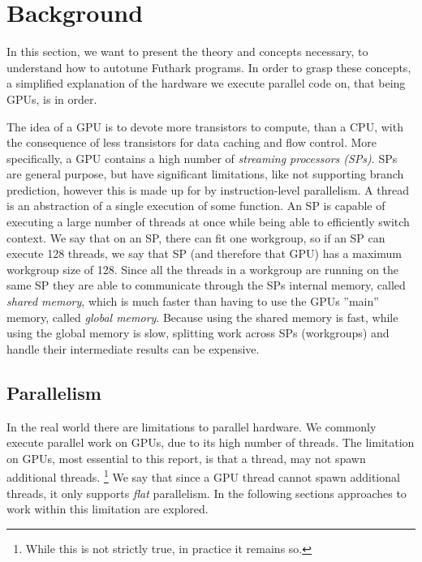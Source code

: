 \section{Background}
\label{BabyGotBack}
\begin{comment}
A common way to increase computer performance, is to increase the capacity for parallelism. For practical usage, however, this is difficult to implement, due to low-level GPU-specific languages requiring domain specific knowledge to make full use of that capacity. A vast amount of work has gone into transforming high-level hardware-agnostic code into these low-level GPU-specific languages \cite{inc-flat}. 
\end{comment}
In this section, we want to present the theory and concepts necessary, to
understand how to autotune Futhark programs. In order to grasp these concepts,
a simplified explanation of the hardware we execute parallel code on,
that being GPUs, is in order. 

The idea of a GPU is to devote more transistors to compute, than a CPU, with
the consequence of less transistors for data caching and flow control. More
specifically, a GPU contains a high number of \textit{streaming
processors (SPs)}. SPs are general purpose, but have significant
limitations, like not supporting branch prediction, however this is made up for by
instruction-level parallelism. A thread is an abstraction of a single execution of
some function. An SP is capable of executing a large number of threads at once while being
able to efficiently switch context. We say that on an SP, there can fit one workgroup,
so if an SP can execute 128 threads, we say that SP (and therefore that GPU) has a
maximum workgroup size of 128. Since all the threads in a workgroup are running
on the same SP they are able to communicate through the SPs
internal memory, called \textit{shared memory}, which is much faster than
having to use the GPUs ''main'' memory, called \textit{global memory}.
Because using the shared memory is fast, while using the global memory is
slow, splitting work across SPs (workgroups) and handle their intermediate
results can be expensive.

\subsection{Parallelism} 
In the real world there are limitations to parallel hardware. We
commonly execute parallel work on GPUs, due to its high number of threads. The
limitation on GPUs, most essential to this report, is that a thread, may not
spawn additional threads. \footnote{While this is not strictly true, in practice it remains
so.} We say that since a GPU thread cannot spawn additional threads, it only
supports \textit{flat} parallelism. In the following sections 
approaches to work within this limitation are explored.


